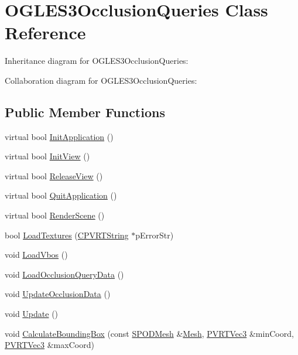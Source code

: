 \hypertarget{class_o_g_l_e_s3_occlusion_queries}{\section{O\+G\+L\+E\+S3\+Occlusion\+Queries Class Reference}
\label{class_o_g_l_e_s3_occlusion_queries}
}


Inheritance diagram for O\+G\+L\+E\+S3\+Occlusion\+Queries\+:


Collaboration diagram for O\+G\+L\+E\+S3\+Occlusion\+Queries\+:
\subsection*{Public Member Functions}
\begin{DoxyCompactItemize}
\item 
virtual bool \hyperlink{class_o_g_l_e_s3_occlusion_queries_a7d99cc3c42047553b96a0e82c67b7773}{Init\+Application} ()
\item 
virtual bool \hyperlink{class_o_g_l_e_s3_occlusion_queries_aeb16433361edf41b75b004f68799793d}{Init\+View} ()
\item 
virtual bool \hyperlink{class_o_g_l_e_s3_occlusion_queries_a5b02be8e6865bbc17041ef202aea6fb0}{Release\+View} ()
\item 
virtual bool \hyperlink{class_o_g_l_e_s3_occlusion_queries_a5301a8d5bf86e67a0602bce93f62f801}{Quit\+Application} ()
\item 
virtual bool \hyperlink{class_o_g_l_e_s3_occlusion_queries_a16db67461f05eaa19f819e24132f74ee}{Render\+Scene} ()
\item 
bool \hyperlink{class_o_g_l_e_s3_occlusion_queries_a4c814e0c8fc7c440ca0fecf80ed1bea4}{Load\+Textures} (\hyperlink{class_c_p_v_r_t_string}{C\+P\+V\+R\+T\+String} $\ast$p\+Error\+Str)
\item 
void \hyperlink{class_o_g_l_e_s3_occlusion_queries_a7a98b0d2cda4f9633611dc37cbd63f84}{Load\+Vbos} ()
\item 
void \hyperlink{class_o_g_l_e_s3_occlusion_queries_ac9416de672b53eac8a9db8fee08fda4b}{Load\+Occlusion\+Query\+Data} ()
\item 
void \hyperlink{class_o_g_l_e_s3_occlusion_queries_a94d3e663fb38ca898652a79213f53ede}{Update\+Occlusion\+Data} ()
\item 
void \hyperlink{class_o_g_l_e_s3_occlusion_queries_a2941aa3703784473ef54026127aff17e}{Update} ()
\item 
void \hyperlink{class_o_g_l_e_s3_occlusion_queries_a95d7ce742b94bb4cedb5e77f88ab65fe}{Calculate\+Bounding\+Box} (const \hyperlink{struct_s_p_o_d_mesh}{S\+P\+O\+D\+Mesh} \&\hyperlink{class_mesh}{Mesh}, \hyperlink{struct_p_v_r_t_vec3}{P\+V\+R\+T\+Vec3} \&min\+Coord, \hyperlink{struct_p_v_r_t_vec3}{P\+V\+R\+T\+Vec3} \&max\+Coord)

\end{DoxyCompactItemize}
